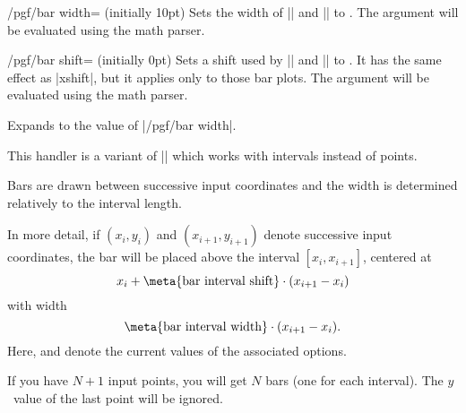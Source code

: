 \label{key-bar-width}%
\begin{key}{/pgf/bar width= (initially 10pt)}
    Sets the width of |\pgfplothandlerxbar| and |\pgfplothandlerybar| to
    . The argument  will be evaluated using the
    math parser.
\end{key}

\label{key-bar-shift}%
\begin{key}{/pgf/bar shift= (initially 0pt)}
    Sets a shift used by |\pgfplothandlerxbar| and |\pgfplothandlerybar| to
    . It has the same effect as |xshift|, but it applies only
    to those bar plots. The argument  will be evaluated using
    the math parser.
\end{key}

\begin{command}{\pgfplotbarwidth}
    Expands to the value of |/pgf/bar width|.
\end{command}

\begin{command}{\pgfplothandlerybarinterval}
    This handler is a variant of |\pgfplothandlerybar| which works with
    intervals instead of points.

    Bars are drawn between successive input coordinates and the width is
    determined relatively to the interval length.
\begin{codeexample}[]
\end{codeexample}

    In more detail, if $(x_i,y_i)$ and $(x_{i+1},y_{i+1})$ denote successive
    input coordinates, the bar will be placed above the interval
    $[x_i,x_{i+1}]$, centered at
        \[ x_i + \text{\meta{bar interval shift}} \cdot (x_{i+1} - x_i) \]
    with width
        \[ \text{\meta{bar interval width}} \cdot (x_{i+1} - x_i). \]
    Here,  and  denote the
    current values of the associated options.

    If you have $N+1$ input points, you will get $N$ bars (one for each
    interval). The $y$~value of the last point will be ignored.
\end{command}

